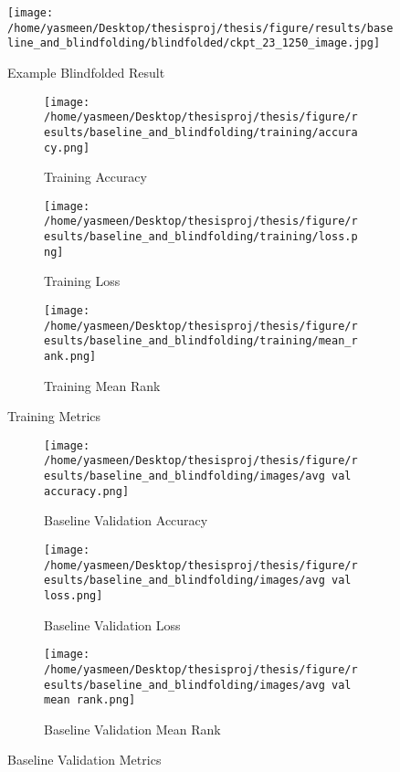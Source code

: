 \begin{figure}[ht!]
	\centering
	\texttt{[image: /home/yasmeen/Desktop/thesisproj/thesis/figure/results/baseline\_and\_blindfolding/blindfolded/ckpt\_23\_1250\_image.jpg]}
	\caption{Example Blindfolded Result}
	\label{fig:example_blindfolded_result}
\end{figure}

\begin{figure}[ht!]
     \centering
     \begin{subfigure}[b]{0.3\textwidth}
         \centering
         \texttt{[image: /home/yasmeen/Desktop/thesisproj/thesis/figure/results/baseline\_and\_blindfolding/training/accuracy.png]}
         \caption{Training Accuracy}
         \label{fig:training_accuracy}
     \end{subfigure}
     \hfill
     \begin{subfigure}[b]{0.3\textwidth}
         \centering
         \texttt{[image: /home/yasmeen/Desktop/thesisproj/thesis/figure/results/baseline\_and\_blindfolding/training/loss.png]}
         \caption{Training Loss}
         \label{fig:training_loss}
     \end{subfigure}
     \hfill
     \begin{subfigure}[b]{0.3\textwidth}
         \centering
         \texttt{[image: /home/yasmeen/Desktop/thesisproj/thesis/figure/results/baseline\_and\_blindfolding/training/mean\_rank.png]}
         \caption{Training Mean Rank}
         \label{fig:training_mean_rank}
     \end{subfigure}
     \caption{Training Metrics}
     \label{fig:training_metrics}
\end{figure}

\begin{figure}[ht!]
     \centering
     \begin{subfigure}[b]{0.3\textwidth}
         \centering
         \texttt{[image: /home/yasmeen/Desktop/thesisproj/thesis/figure/results/baseline\_and\_blindfolding/images/avg val accuracy.png]}
         \caption{Baseline Validation Accuracy}
         \label{fig:baseline_accuracy}
     \end{subfigure}
     \hfill
     \begin{subfigure}[b]{0.3\textwidth}
         \centering
         \texttt{[image: /home/yasmeen/Desktop/thesisproj/thesis/figure/results/baseline\_and\_blindfolding/images/avg val loss.png]}
         \caption{Baseline Validation Loss}
         \label{fig:baseline_loss}
     \end{subfigure}
     \hfill
     \begin{subfigure}[b]{0.3\textwidth}
         \centering
         \texttt{[image: /home/yasmeen/Desktop/thesisproj/thesis/figure/results/baseline\_and\_blindfolding/images/avg val mean rank.png]}
         \caption{Baseline Validation Mean Rank}
         \label{fig:baseline_mean_rank}
     \end{subfigure}
     \caption{Baseline Validation Metrics}
     \label{fig:baseline_metrics}
\end{figure}


